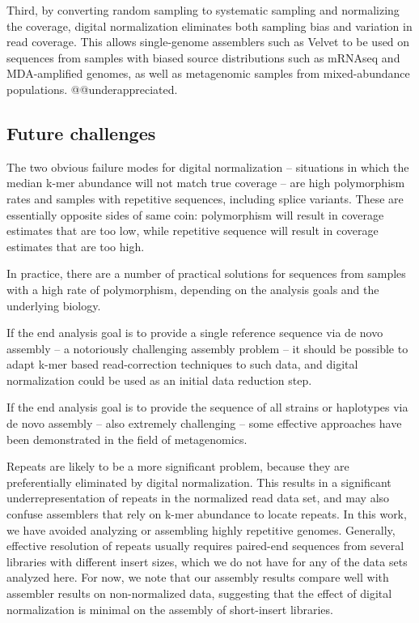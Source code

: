 \documentclass[10pt]{article}
\begin{document}
Third, by converting random sampling to systematic sampling and
normalizing the coverage, digital normalization eliminates both
sampling bias and variation in read coverage.  This allows
single-genome assemblers such as Velvet to be used on sequences from
samples with biased source distributions such as mRNAseq and
MDA-amplified genomes, as well as metagenomic samples from
mixed-abundance populations. @@underappreciated.

\subsection*{Future challenges}

The two obvious failure modes for digital normalization -- situations
in which the median k-mer abundance will not match true coverage --
are high polymorphism rates and samples with repetitive sequences,
including splice variants.  These are essentially opposite sides of
same coin: polymorphism will result in coverage estimates that are too
low, while repetitive sequence will result in coverage estimates that
are too high.

In practice, there are a number of practical solutions for sequences
from samples with a high rate of polymorphism, depending on the
analysis goals and the underlying biology.

If the end analysis goal is to provide a single reference sequence via
de novo assembly -- a notoriously challenging assembly problem -- it
should be possible to adapt k-mer based read-correction techniques to
such data, and digital normalization could be used as an initial data
reduction step.

If the end analysis goal is to provide the sequence of all strains or
haplotypes via de novo assembly -- also extremely challenging -- some
effective approaches have been demonstrated in the field of
metagenomics.

Repeats are likely to be a more significant problem, because they are
preferentially eliminated by digital normalization.  This results in a
significant underrepresentation of repeats in the normalized read data
set, and may also confuse assemblers that rely on k-mer abundance to
locate repeats.  In this work, we have avoided analyzing or assembling
highly repetitive genomes.  Generally, effective resolution of repeats
usually requires paired-end sequences from several libraries with
different insert sizes, which we do not have for any of the data sets
analyzed here.  For now, we note that our assembly results compare
well with assembler results on non-normalized data, suggesting that
the effect of digital normalization is minimal on the assembly of
short-insert libraries.
\end{document}
